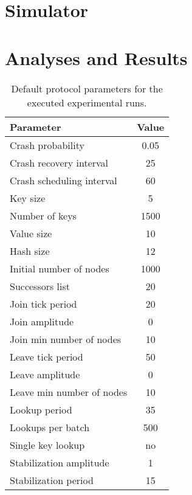 \documentclass[11pt,twocolumn,letterpaper]{article}
\begin{document}
	\section{Simulator}
	\label{sec:simulator}
	
	\section{Analyses and Results}
	\label{sec:analyses}
	\begin{table}[!ht]
		\caption{Default protocol parameters for the executed experimental runs.}
		\label{tab:default_params}
		\centering
		\begin{tabular}{lc}
			\hline
			\textbf{Parameter} & \textbf{Value} \\
			\hline
			Crash probability & 0.05\\
			\hline
			Crash recovery interval & 25\\
			\hline
			Crash scheduling interval & 60\\
			\hline
			Key size & 5 \\
			\hline
			Number of keys & 1500\\
			\hline
			Value size & 10\\
			\hline
			Hash size & 12\\
			\hline
			Initial number of nodes & 1000\\
			\hline
			Successors list & 20\\
			\hline
			Join tick period & 20\\
			\hline
			Join amplitude & 0\\
			\hline
			Join min number of nodes & 10\\
			\hline
			Leave tick period & 50\\
			\hline
			Leave amplitude & 0\\
			\hline
			Leave min number of nodes & 10\\
			\hline
			Lookup period & 35\\
			\hline
			Lookups per batch & 500\\
			\hline
			Single key lookup & no\\
			\hline
			Stabilization amplitude & 1\\
			\hline
			Stabilization period & 15\\
			\hline
		\end{tabular}
	\end{table}
\end{document}
